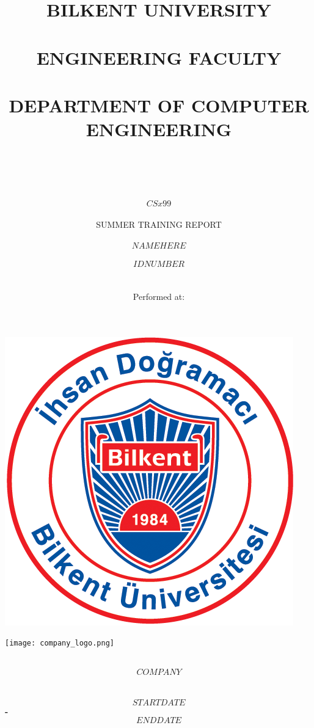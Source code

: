 \documentclass[10pt]{article}
\title{BILKENT UNIVERSITY \\ ~\\ ENGINEERING FACULTY \\ ~\\
DEPARTMENT OF COMPUTER ENGINEERING \\ ~\\ ~\\}
\author{\[CSx99\] \\ SUMMER TRAINING REPORT \\ ~\\ \[NAMEHERE\] \\ \[ID NUMBER\] \\ ~\\ Performed at:}
\begin{document}
\begin{titlingpage} %
    \begin{center}
        \begin{large}
            \textbf{\thetitle} %
        \end{large}

        \includegraphics[scale=1.3]{bilkent_logo.png}\\ %

        \begin{LARGE}
            \textbf{\theauthor} %
        \end{LARGE}

        \texttt{[image: company\_logo.png]} %

        \begin{Large}
            \textbf{\\ \[COMPANY\] ~\\}
            \textbf{\\ \[START DATE\] - \[END DATE\]}
        \end{Large}
    \end{center}
\end{titlingpage}

\tableofcontents

\newpage
\end{document}
